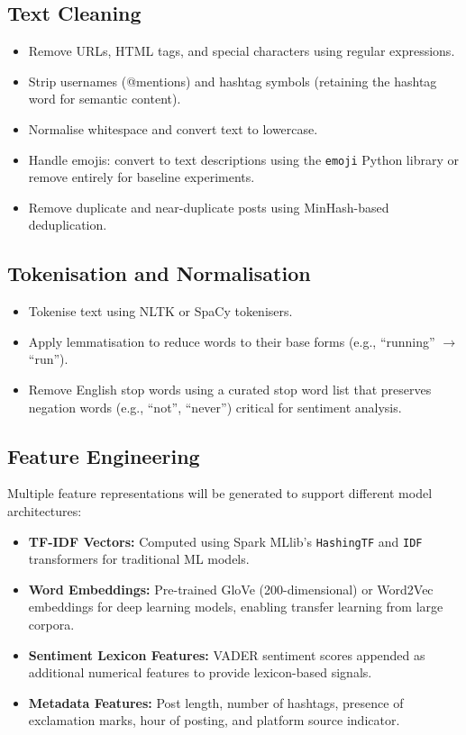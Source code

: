 \documentclass[conference]{IEEEtran}
\begin{document}
\subsection{Text Cleaning}
\begin{itemize}[leftmargin=*]
    \item Remove URLs, HTML tags, and special characters using regular expressions.
    \item Strip usernames (@mentions) and hashtag symbols (retaining the hashtag word for semantic content).
    \item Normalise whitespace and convert text to lowercase.
    \item Handle emojis: convert to text descriptions using the \texttt{emoji} Python library or remove entirely for baseline experiments.
    \item Remove duplicate and near-duplicate posts using MinHash-based deduplication.
\end{itemize}

\subsection{Tokenisation and Normalisation}
\begin{itemize}[leftmargin=*]
    \item Tokenise text using NLTK or SpaCy tokenisers.
    \item Apply lemmatisation to reduce words to their base forms (e.g., ``running'' $\rightarrow$ ``run'').
    \item Remove English stop words using a curated stop word list that preserves negation words (e.g., ``not'', ``never'') critical for sentiment analysis.
\end{itemize}

\subsection{Feature Engineering}
Multiple feature representations will be generated to support different model architectures:
\begin{itemize}[leftmargin=*]
    \item \textbf{TF-IDF Vectors:} Computed using Spark MLlib's \texttt{HashingTF} and \texttt{IDF} transformers for traditional ML models.
    \item \textbf{Word Embeddings:} Pre-trained GloVe (200-dimensional) or Word2Vec embeddings for deep learning models, enabling transfer learning from large corpora.
    \item \textbf{Sentiment Lexicon Features:} VADER sentiment scores appended as additional numerical features to provide lexicon-based signals.
    \item \textbf{Metadata Features:} Post length, number of hashtags, presence of exclamation marks, hour of posting, and platform source indicator.
\end{itemize}
\end{document}

